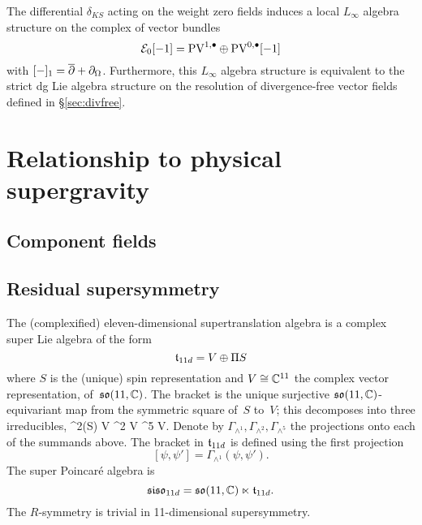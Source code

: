 \documentclass[11pt]{amsart}
\begin{document}
\begin{prop}
\label{prop:Linfty}
The differential $\delta_{KS}$ acting on the weight zero fields induces a local $L_\infty$ algebra structure on the complex of vector bundles 
\[
\mathcal E_0 [-1] = {\rm PV}^{1,\bullet} \oplus {\rm PV}^{0,\bullet}[-1]
\]
with $[-]_1 = \overline{\partial} + \partial_{\Omega}$. 
Furthermore, this $L_\infty$ algebra structure is equivalent to the strict dg Lie algebra structure on the resolution of divergence-free vector fields defined in \S \ref{sec:divfree}. 
\end{prop}

\section{Relationship to physical supergravity}

\subsection{Component fields}


\subsection{Residual supersymmetry} 



The (complexified) eleven-dimensional supertranslation algebra is a complex super Lie algebra of the form
\[
  \mathfrak t_{11d} = V \oplus \Pi S
\]
where $S$ is the (unique) spin representation and $V \cong \mathbb C^{11}$ the complex vector representation, of~$\mathfrak{so}(11, \mathbb C)$. 
The bracket is the unique surjective $\mathfrak{so}(11,\mathbb C)$-equivariant map from the symmetric square of~$S$ to~$V$;
this decomposes into three irreducibles, 
\beqn\label{eqn:decomp}
  \Sym^2(S) \cong V \oplus \wedge^2 V \oplus \wedge^5 V.
\eeqn
Denote by $\Gamma_{\wedge^1}, \Gamma_{\wedge^2}, \Gamma_{\wedge^5}$ the projections onto each of the summands above. 
The bracket in $\mathfrak t_{11d}$ is defined using the first projection
\[
[\psi, \psi'] = \Gamma_{\wedge^1} (\psi, \psi') .
\]
The super Poincar\'{e} algebra is
\[
  \mathfrak{siso}_{11d} = \mathfrak{so}(11 , \mathbb C) \ltimes \mathfrak t_{11d} .
\]
The $R$-symmetry is trivial in 11-dimensional supersymmetry. 


\end{document}
